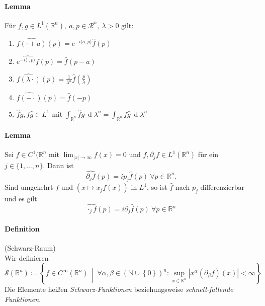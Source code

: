 \documentclass[12pt,a4paper,fleqn]{article}
\def\abs#1{{\left\vert #1 \right\vert}}
\def\set#1{{\left\{ #1 \right\}}}
\def\Mid{\ \middle|\ }
\def\d{{\operatorname{d}}}
\begin{document}
\paragraph{Lemma} Für $f, g \in L^1(\mathbb{R}^n),\ a, p \in \mathcal{R}^n,\ \lambda >0$ gilt:
\begin{enumerate}
\item$\widehat{f(\cdot + a)}(p) = e^{-i\langle a, p\rangle} \widehat{f}(p)$
\item$\widehat{e^{-i\langle \cdot, p\rangle} f}(p) = \widehat{f}(p-a)$
\item$\widehat{f(\lambda\cdot)}(p) = \frac{1}{\lambda^n} \widehat{f}(\frac{p}{\lambda})$
\item$\widehat{f(-\cdot)}(p) = \widehat{f}(-p)$
\item$\widehat{f}g, f\widehat{g} \in L^1$ mit $\int_{\mathbb{R}^n} \widehat{f}g\ \d\lambda^n = \int_{\mathbb{R}^n} f\widehat{g}\ \d\lambda^n$
\end{enumerate}

\paragraph{Lemma} Sei $f \in C^1(\mathbb{R}^n$ mit $\lim_{\vert x \vert \rightarrow \infty} f(x) = 0$ und $f, \partial_j f \in L^1(\mathbb{R}^n)$ für ein \mbox{$j \in \{1, \dots, n\}$}. Dann ist
\begin{displaymath}
\widehat{\partial_j f}(p) = ip_j \widehat{f}(p)\ \forall p \in \mathbb{R}^n.
\end{displaymath}
Sind umgekehrt $f$ und $(x \mapsto x_j f(x))$ in $L^1$, so ist $\widehat{f}$ nach $p_j$ differenzierbar und es gilt
\begin{displaymath}
\widehat{\cdot_j f}(p) = i\partial_j\widehat{f}(p)\ \forall p \in \mathbb{R}^n
\end{displaymath}

\paragraph{Definition} (Schwarz-Raum)\\
Wir definieren
\begin{displaymath}
\mathscr{S}(\mathbb{R}^n) \coloneqq \set{f \in C^\infty(\mathbb{R}^n) \Mid \forall\alpha, \beta \in (\mathbb{N} \cup \set{0})^n : \sup_{x \in \mathbb{R}^n} \abs{x^\alpha(\partial_\beta f)(x)} < \infty}
\end{displaymath}
Die Elemente heißen \textit{Schwarz-Funktionen} beziehungsweise \textit{schnell-fallende Funktionen}.
\end{document}

